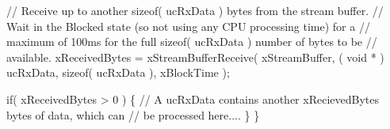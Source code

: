 \begin{DoxyPre} // Receive up to another sizeof( ucRxData ) bytes from the stream buffer.
 // Wait in the Blocked state (so not using any CPU processing time) for a
 // maximum of 100ms for the full sizeof( ucRxData ) number of bytes to be
 // available.
 xReceivedBytes = xStreamBufferReceive( xStreamBuffer,
                                        ( void * ) ucRxData,
                                        sizeof( ucRxData ),
                                        xBlockTime );\end{DoxyPre}



\begin{DoxyPre} if( xReceivedBytes > 0 )
 \{
     // A ucRxData contains another xRecievedBytes bytes of data, which can
     // be processed here....
 \}
\}
\end{DoxyPre}
 